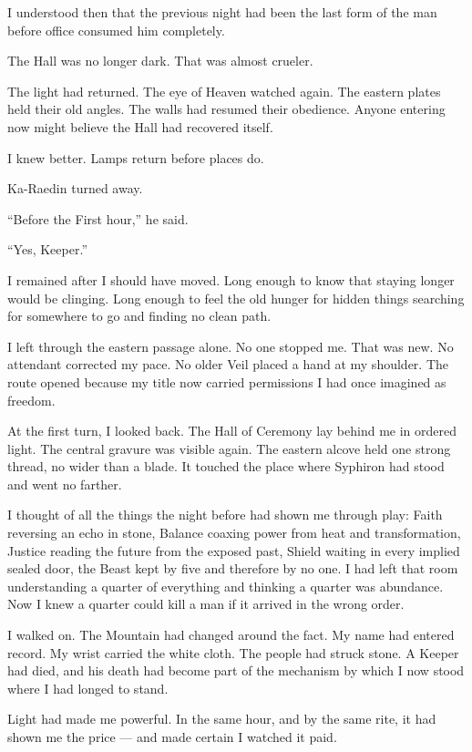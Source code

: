 I understood then that the previous night had been the last form of the man before office consumed him completely.\par
The Hall was no longer dark.
That was almost crueler.\par
The light had returned.
The eye of Heaven watched again.
The eastern plates held their old angles.
The walls had resumed their obedience.
Anyone entering now might believe the Hall had recovered itself.\par
I knew better.
Lamps return before places do.\par
Ka-Raedin turned away.\par
``Before the First hour,'' he said.\par
``Yes, Keeper.''\par
I remained after I should have moved.
Long enough to know that staying longer would be clinging.
Long enough to feel the old hunger for hidden things searching for somewhere to go and finding no clean path.\par
I left through the eastern passage alone.
No one stopped me.
That was new.
No attendant corrected my pace.
No older Veil placed a hand at my shoulder.
The route opened because my title now carried permissions I had once imagined as freedom.\par
At the first turn, I looked back.
The Hall of Ceremony lay behind me in ordered light.
The central gravure was visible again.
The eastern alcove held one strong thread, no wider than a blade.
It touched the place where Syphiron had stood and went no farther.\par
I thought of all the things the night before had shown me through play: Faith reversing an echo in stone, Balance coaxing power from heat and transformation, Justice reading the future from the exposed past, Shield waiting in every implied sealed door, the Beast kept by five and therefore by no one.
I had left that room understanding a quarter of everything and thinking a quarter was abundance.
Now I knew a quarter could kill a man if it arrived in the wrong order.\par
I walked on.
The Mountain had changed around the fact.
My name had entered record.
My wrist carried the white cloth.
The people had struck stone.
A Keeper had died, and his death had become part of the mechanism by which I now stood where I had longed to stand.\par
Light had made me powerful. In the same hour, and by the same rite, it had shown me the price --- and made certain I watched it paid.\par

\ornament
